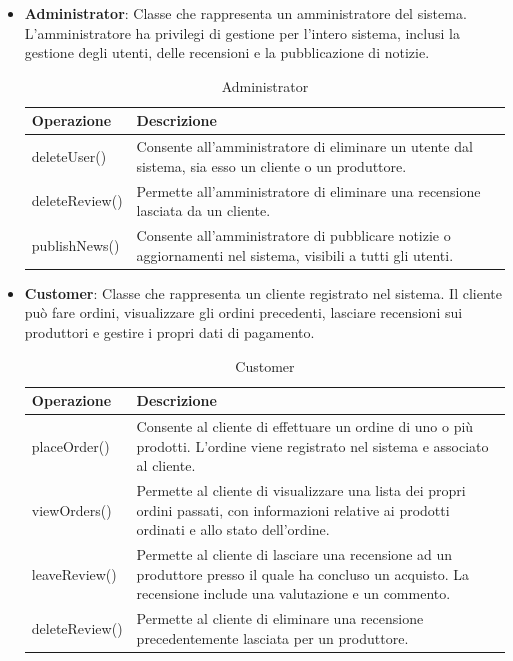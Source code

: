 \begin{itemize}
\item \textbf{Administrator}:
Classe che rappresenta un amministratore del sistema. L'amministratore ha privilegi di gestione per l'intero sistema, inclusi la gestione degli utenti, delle recensioni e la pubblicazione di notizie.
\begin{table}[!htbp]
    \centering
    \begin{tabularx}{0.9\textwidth}{ >{\centering\arraybackslash}m{4cm} | X  } 
    \hline
         \textbf{Operazione} & \textbf{Descrizione} \\
         \hline
         deleteUser() & Consente all'amministratore di eliminare un utente dal sistema, sia esso un cliente o un produttore. \\
         \hline
         deleteReview() & Permette all'amministratore di eliminare una recensione lasciata da un cliente. \\
         \hline
         publishNews() & Consente all'amministratore di pubblicare notizie o aggiornamenti nel sistema, visibili a tutti gli utenti. \\
         \hline
    \end{tabularx}
    \caption{Administrator}
\end{table}

\item \textbf{Customer}:
Classe che rappresenta un cliente registrato nel sistema. Il cliente può fare ordini, visualizzare gli ordini precedenti, lasciare recensioni sui produttori e gestire i propri dati di pagamento.
\begin{table}[!htbp]
    \centering
    \begin{tabularx}{0.9\textwidth}{ >{\centering\arraybackslash}m{4cm} | X  } 
    \hline
         \textbf{Operazione} & \textbf{Descrizione} \\
         \hline
         placeOrder() & Consente al cliente di effettuare un ordine di uno o più prodotti. L'ordine viene registrato nel sistema e associato al cliente. \\
         \hline
         viewOrders() & Permette al cliente di visualizzare una lista dei propri ordini passati, con informazioni relative ai prodotti ordinati e allo stato dell'ordine. \\
         \hline
         leaveReview() & Permette al cliente di lasciare una recensione ad un produttore presso il quale ha concluso un acquisto. La recensione include una valutazione e un commento. \\
         \hline
         deleteReview() & Permette al cliente di eliminare una recensione precedentemente lasciata per un produttore. \\
         \hline
    \end{tabularx}
    \caption{Customer}
\end{table}



\end{itemize}
